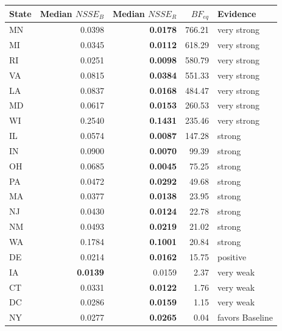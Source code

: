 
\begin{tabular}{lrrrl}
\toprule
State & Median $NSSE_{B}$ & Median $NSSE_{R}$ & $BF_{eq}$ & Evidence\\
\midrule
MN & 0.0398 & \textbf{0.0178} & 766.21 & very strong\\
MI & 0.0345 & \textbf{0.0112} & 618.29 & very strong\\
RI & 0.0251 & \textbf{0.0098} & 580.79 & very strong\\
VA & 0.0815 & \textbf{0.0384} & 551.33 & very strong\\
LA & 0.0837 & \textbf{0.0168} & 484.47 & very strong\\
MD & 0.0617 & \textbf{0.0153} & 260.53 & very strong\\
WI & 0.2540 & \textbf{0.1431} & 235.46 & very strong\\
IL & 0.0574 & \textbf{0.0087} & 147.28 & strong\\
IN & 0.0900 & \textbf{0.0070} & 99.39 & strong\\
OH & 0.0685 & \textbf{0.0045} & 75.25 & strong\\
PA & 0.0472 & \textbf{0.0292} & 49.68 & strong\\
MA & 0.0377 & \textbf{0.0138} & 23.95 & strong\\
NJ & 0.0430 & \textbf{0.0124} & 22.78 & strong\\
NM & 0.0493 & \textbf{0.0219} & 21.02 & strong\\
WA & 0.1784 & \textbf{0.1001} & 20.84 & strong\\
DE & 0.0214 & \textbf{0.0162} & 15.75 & positive\\
IA & \textbf{0.0139} & 0.0159 & 2.37 & very weak\\
CT & 0.0331 & \textbf{0.0122} & 1.76 & very weak\\
DC & 0.0286 & \textbf{0.0159} & 1.15 & very weak\\
NY & 0.0277 & \textbf{0.0265} & 0.04 & favors Baseline\\
\bottomrule
\end{tabular}

